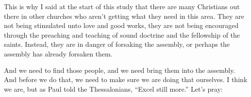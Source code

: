 \documentclass[letterpaper, 12pt]{article}
\begin{document}
    This is why I said at the start of this study that there are many
    Christians out there in other churches who aren't getting what they
    need in this area. They are not being stimulated unto love and good
    works, they are not being encouraged through the preaching and
    teaching of sound doctrine and the fellowship of the saints.
    Instead, they are in danger of forsaking the assembly, or perhaps
    the assembly has already forsaken them. 

    And we need to find those people, and we need bring them into the
    assembly. And before we do that, we need to make sure we are doing
    that ourselves. I think we are, but as Paul told the Thessalonians,
    ``Excel still more.'' Let's pray:
\end{document}
